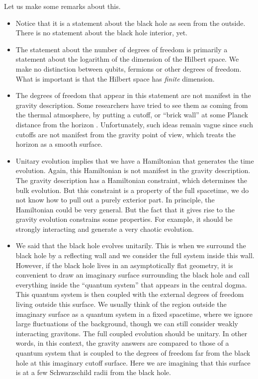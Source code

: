 Let us make some remarks about this. 
\begin{itemize}
	\item 
	Notice that it is a statement about the black hole as seen from the outside. There is no statement about the black hole interior, yet.  
\item
The statement about the number of degrees of freedom is primarily a statement about the logarithm of the dimension  of the Hilbert space. We make no distinction between qubits, fermions or other degrees of freedom. What is important is that the Hilbert space has {\it finite} dimension.   
\item
The degrees of freedom that appear in this statement are not manifest in the gravity description. Some researchers have tried to see them as coming from the thermal atmosphere, by putting a cutoff, or ``brick wall'' at some Planck distance from the horizon \cite{tHooft:1984kcu,Thorne:1986iy}. Unfortunately, such ideas remain vague since such cutoffs are not manifest from the gravity point of view, which treats the horizon as a smooth surface. 
\item
Unitary evolution implies that we have a Hamiltonian that generates the time evolution. Again, this Hamiltonian is not manifest in the gravity description. The gravity description has a Hamiltonian constraint, which determines the bulk evolution. But this constraint is a property of the full spacetime, we do not know how to pull out a purely exterior part.  
In principle, the Hamiltonian could  be very general. But the fact that it gives rise to the gravity evolution constrains some properties. For example, it should be strongly interacting and generate a very chaotic evolution. 
\item
We said that the black hole evolves unitarily.   This is when we surround the black hole by a reflecting wall and we consider the full system inside this wall. However, if the black hole lives in an asymptotically flat geometry, it is convenient to draw an imaginary surface surrounding the black hole and call everything inside the ``quantum system'' that appears in the central dogma. This quantum system is then coupled   with the external degrees of freedom living outside this surface.  We usually think of the region outside the imaginary surface as a quantum system in a fixed spacetime, where we ignore large fluctuations of the background, though  we can still consider weakly interacting gravitons.  The full coupled evolution should be unitary. In other words, in this context, the gravity answers are compared to those of a quantum system that is coupled to the degrees of freedom far from the black hole at this imaginary cutoff surface. Here we are imagining that this surface is at a few Schwarzschild radii from the black hole. 

\end{itemize}
